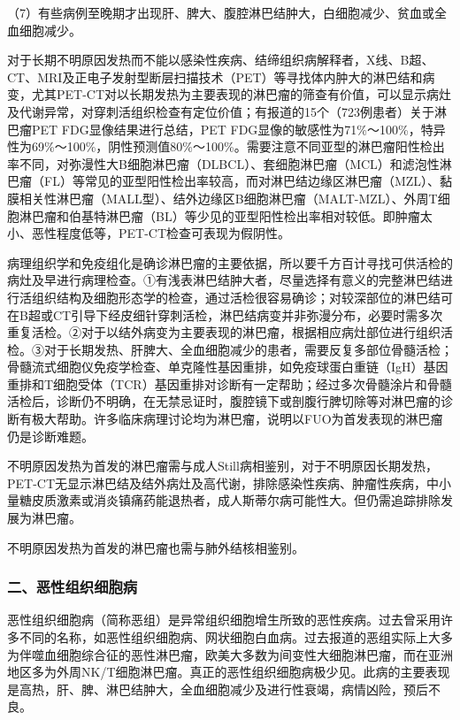 （7）有些病例至晚期才出现肝、脾大、腹腔淋巴结肿大，白细胞减少、贫血或全血细胞减少。

对于长期不明原因发热而不能以感染性疾病、结缔组织病解释者，X线、B超、CT、MRI及正电子发射型断层扫描技术（PET）等寻找体内肿大的淋巴结和病变，尤其PET-CT对以长期发热为主要表现的淋巴瘤的筛查有价值，可以显示病灶及代谢异常，对穿刺活组织检查有定位价值；有报道的15个（723例患者）关于淋巴瘤PET
FDG显像结果进行总结，PET
FDG显像的敏感性为71\%～100\%，特异性为69\%～100\%，阴性预测值80\%～100\%。需要注意不同亚型的淋巴瘤阳性检出率不同，对弥漫性大B细胞淋巴瘤（DLBCL）、套细胞淋巴瘤（MCL）和滤泡性淋巴瘤（FL）等常见的亚型阳性检出率较高，而对淋巴结边缘区淋巴瘤（MZL）、黏膜相关性淋巴瘤（MALL型）、结外边缘区B细胞淋巴瘤（MALT-MZL）、外周T细胞淋巴瘤和伯基特淋巴瘤（BL）等少见的亚型阳性检出率相对较低。即肿瘤太小、恶性程度低等，PET-CT检查可表现为假阴性。

病理组织学和免疫组化是确诊淋巴瘤的主要依据，所以要千方百计寻找可供活检的病灶及早进行病理检查。①有浅表淋巴结肿大者，尽量选择有意义的完整淋巴结进行活组织结构及细胞形态学的检查，通过活检很容易确诊；对较深部位的淋巴结可在B超或CT引导下经皮细针穿刺活检，淋巴结病变并非弥漫分布，必要时需多次重复活检。②对于以结外病变为主要表现的淋巴瘤，根据相应病灶部位进行组织活检。③对于长期发热、肝脾大、全血细胞减少的患者，需要反复多部位骨髓活检；骨髓流式细胞仪免疫学检查、单克隆性基因重排，如免疫球蛋白重链（IgH）基因重排和T细胞受体（TCR）基因重排对诊断有一定帮助；经过多次骨髓涂片和骨髓活检后，诊断仍不明确，在无禁忌证时，腹腔镜下或剖腹行脾切除等对淋巴瘤的诊断有极大帮助。许多临床病理讨论均为淋巴瘤，说明以FUO为首发表现的淋巴瘤仍是诊断难题。

不明原因发热为首发的淋巴瘤需与成人Still病相鉴别，对于不明原因长期发热，PET-CT无显示淋巴结及结外病灶及高代谢，排除感染性疾病、肿瘤性疾病，中小量糖皮质激素或消炎镇痛药能退热者，成人斯蒂尔病可能性大。但仍需追踪排除发展为淋巴瘤。

不明原因发热为首发的淋巴瘤也需与肺外结核相鉴别。

\subsubsection{二、恶性组织细胞病}

恶性组织细胞病（简称恶组）是异常组织细胞增生所致的恶性疾病。过去曾采用许多不同的名称，如恶性组织细胞病、网状细胞白血病。过去报道的恶组实际上大多为伴噬血细胞综合征的恶性淋巴瘤，欧美大多数为间变性大细胞淋巴瘤，而在亚洲地区多为外周NK/T细胞淋巴瘤。真正的恶性组织细胞病极少见。此病的主要表现是高热，肝、脾、淋巴结肿大，全血细胞减少及进行性衰竭，病情凶险，预后不良。

